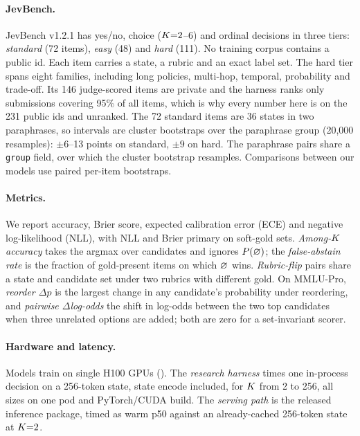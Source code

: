 \paragraph{JevBench.} JevBench v1.2.1 has yes/no, choice ($K{=}2$--6) and ordinal decisions in
three tiers: \emph{standard} (72 items), \emph{easy} (48) and \emph{hard} (111). No training corpus
contains a public id. Each item carries a state, a rubric and an exact label set. The hard tier spans
eight families, including long policies, multi-hop, temporal, probability and trade-off. Its 146
judge-scored items are private and the harness ranks only submissions covering 95\% of all items, which
is why every number here is on the 231 public ids and unranked. The 72 standard items are 36 states in
two paraphrases, so intervals are cluster bootstraps over the paraphrase group (20{,}000 resamples):
$\pm6$--13 points on standard, $\pm9$ on hard. The paraphrase pairs share a \texttt{group} field, over
which the cluster bootstrap resamples. Comparisons between our models use paired per-item bootstraps.

\paragraph{Metrics.}
\label{sec:setup:metrics}
We report accuracy, Brier score, expected calibration error (ECE) and negative log-likelihood (NLL),
with NLL and Brier primary on soft-gold sets. \emph{Among-$K$ accuracy} takes the argmax over
candidates and ignores $P(\varnothing)$; the \emph{false-abstain rate} is the fraction of gold-present items on
which $\varnothing$ wins. \emph{Rubric-flip} pairs share a state and candidate set under two rubrics with
different gold. On MMLU-Pro, \emph{reorder $\Delta p$} is the largest change in any candidate's
probability under reordering, and \emph{pairwise $\Delta$log-odds} the shift in log-odds between the two
top candidates when three unrelated options are added; both are zero for a set-invariant scorer.

\paragraph{Hardware and latency.}
\label{sec:setup:hardware}
Models train on single H100 GPUs (). The \emph{research harness} times one
in-process decision on a 256-token state, state encode included, for $K$ from 2 to 256, all sizes
on one pod and PyTorch/CUDA build. The \emph{serving path} is the released inference package, timed as
warm p50 against an already-cached 256-token state at $K{=}2$.

